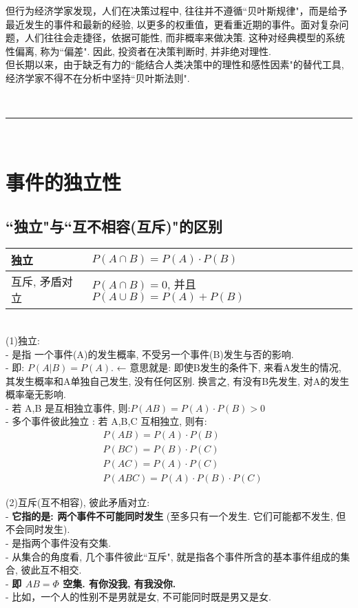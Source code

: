 \documentclass[UTF8]{ctexart}
\begin{document}
但行为经济学家发现，人们在决策过程中, 往往并不遵循``贝叶斯规律"，而是给予最近发生的事件和最新的经验, 以更多的权重值，更看重近期的事件。面对复杂问题，人们往往会走捷径，依据可能性, 而非概率来做决策. 这种对经典模型的系统性偏离, 称为``偏差". 因此, 投资者在决策判断时, 并非绝对理性.  \\
但长期以来，由于缺乏有力的``能结合人类决策中的理性和感性因素"的替代工具, 经济学家不得不在分析中坚持``贝叶斯法则".

~\\
\hrule
~\\


	
\section{ 事件的独立性}

	

\subsection{``独立"与``互不相容(互斥)"的区别}	


\begin{tabular}{|l|l|}
	\hline
	独立 &   $P(A \cap B)=P(A) \cdot P(B)$ \\	
	\hline
	互斥, 矛盾对立 &  $P(A \cap B)=0$, 并且 $P(A \cup B)=P(A) + P(B)$ \\	
	\hline
\end{tabular} \\


(1)独立: \\
- 是指 一个事件(A)的发生概率, 不受另一个事件(B)发生与否的影响. \\
- 即: $ P(A|B)=P(A)$.  ← 意思就是: 即使B发生的条件下, 来看A发生的情况, 其发生概率和A单独自己发生, 没有任何区别. 换言之, 有没有B先发生, 对A的发生概率毫无影响.\\
- 若 A,B 是互相独立事件, 则:$ P(AB)=P(A) \cdot P(B) > 0$ \\

- 多个事件彼此独立 : 若 A,B,C 互相独立, 则有: 
\begin{align*}  %
	& P(AB)=P(A)\cdot P(B)\\
& P(BC)=P(B)\cdot P(C)\\
& P(AC)=P(A)\cdot P(C)\\
& P(ABC)=P(A)\cdot P(B)\cdot P(C) 
\end{align*}


(2)互斥(互不相容), 彼此矛盾对立: \\
- \textbf{它指的是: 两个事件不可能同时发生} (至多只有一个发生. 它们可能都不发生, 但不会同时发生). \\
-  是指两个事件没有交集. \\
- 从集合的角度看, 几个事件彼此``互斥", 就是指各个事件所含的基本事件组成的集合, 彼此互不相交. \\
- \textbf{即 $ AB=\varPhi $ 空集.  有你没我, 有我没你.} \\
- 比如，一个人的性别不是男就是女, 不可能同时既是男又是女. \\
\end{document}
